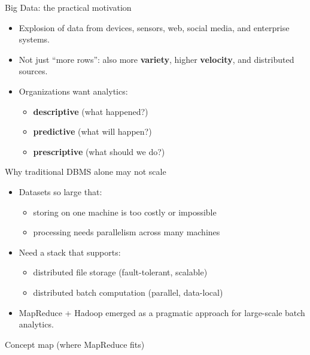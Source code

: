 \documentclass[10pt,aspectratio=169]{beamer}
\begin{document}
\begin{frame}{Big Data: the practical motivation}
\begin{itemize}
  \item Explosion of data from devices, sensors, web, social media, and enterprise systems.
  \item Not just “more rows”: also more \textbf{variety}, higher \textbf{velocity}, and distributed sources.
  \item Organizations want analytics:
  \begin{itemize}
    \item \textbf{descriptive} (what happened?)
    \item \textbf{predictive} (what will happen?)
    \item \textbf{prescriptive} (what should we do?)
  \end{itemize}
\end{itemize}
\end{frame}

\begin{frame}{Why traditional DBMS alone may not scale}
\begin{itemize}
  \item Datasets so large that:
  \begin{itemize}
    \item storing on one machine is too costly or impossible
    \item processing needs parallelism across many machines
  \end{itemize}
  \item Need a stack that supports:
  \begin{itemize}
    \item distributed file storage (fault-tolerant, scalable)
    \item distributed batch computation (parallel, data-local)
  \end{itemize}
  \item MapReduce + Hadoop emerged as a pragmatic approach for large-scale batch analytics.
\end{itemize}
\end{frame}

\begin{frame}{Concept map (where MapReduce fits)}
\centering
{}
\end{frame}
\end{document}
